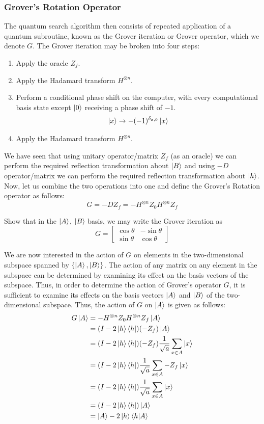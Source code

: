 \subsubsection{Grover's Rotation Operator}
 The quantum search algorithm then consists of repeated application of a quantum subroutine, known as the Grover iteration or Grover operator, which we denote $G$. The Grover iteration may be broken into four steps:
\begin{enumerate}
    \item Apply the oracle $Z_f$.
    \item Apply the Hadamard transform $H^{\otimes n}$.
    \item Perform a conditional phase shift on the computer, with every computational basis state except $\ket{0}$ receiving a phase shift of $-1$.
    \[
    \ket{x}\rightarrow -(-1)^{\delta_{x,0}} \ket{x}
    \]
    \item Apply the Hadamard transform $H^{\otimes n}$.
\end{enumerate}
We have seen that using unitary operator/matrix $Z_f$ (as an oracle) we can perform the required reflection transformation about $\ket{B}$ and using $-D$ operator/matrix we can perform the required reflection transformation about $\ket{h}$. Now, let us combine the two operations into one and define the Grover's Rotation operator as follows:
\[
G=-DZ_f=-H^{\otimes n}Z_0H^{\otimes n}Z_f
\]
\begin{example}
    Show that in the $\ket{A}$, $\ket{B}$ basis, we may write the Grover iteration as 
    \[
    G=\begin{bmatrix} \cos \theta & -\sin \theta \\ \sin \theta & \cos \theta \end{bmatrix}
    \]
\end{example}
We are now interested in the action of $G$ on elements in the two-dimensional subspace spanned by $\{\ket{A},\ket{B}\}$. The action of any matrix on any element in the subspace can be determined by examining its effect on the basis vectors of the subspace. Thus, in order to determine the action of Grover's operator $G$, it is sufficient to examine its effects on the basis vectors $\ket{A}$ and $\ket{B}$ of the two-dimensional subspace. Thus, the action of $G$ on $\ket{A}$ is given as follows:
\begin{align*}
    G\ket{A}&=-H^{\otimes n}Z_0H^{\otimes n}Z_f\ket{A} \\
    &=(I-2\ket{h}\bra{h})(-Z_f)\ket{A}\\
    &=(I-2\ket{h}\bra{h})(-Z_f)\frac{1}{\sqrt{a}}\sum_{x \in A}\ket{x}\\
    &=(I-2\ket{h}\bra{h})\frac{1}{\sqrt{a}}\sum_{x \in A}-Z_f\ket{x}\\
    &=(I-2\ket{h}\bra{h})\frac{1}{\sqrt{a}}\sum_{x \in A}\ket{x}\\
    &=(I-2\ket{h}\bra{h})\ket{A}\\
    &=\ket{A}-2\ket{h}\braket{h|A}\\
\end{align*}
